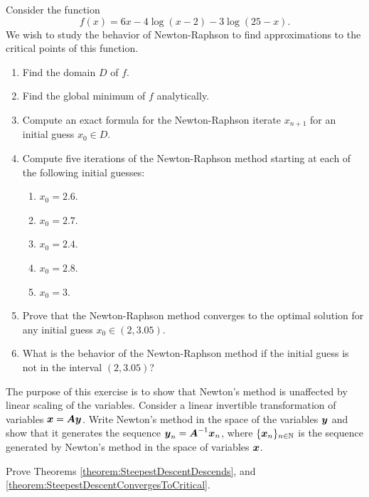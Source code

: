 \begin{problem}
Consider the function 
\begin{equation*}
f(x) = 6x -4\log(x-2) -3\log(25-x).
\end{equation*}
We wish to study the behavior of Newton-Raphson to find approximations to the critical points of this function.
\begin{enumerate}
	\item Find the domain $D$ of $f$.
	\item Find the global minimum of $f$ analytically. 
	\item Compute an exact formula for the Newton-Raphson iterate $x_{n+1}$ for an initial guess $x_0 \in D$.
	\item Compute five iterations of the Newton-Raphson method starting at each of the following initial guesses:
	\begin{enumerate}
		\item $x_0 = 2.6$.
		\item $x_0 = 2.7$.
		\item $x_0 = 2.4$.
		\item $x_0 = 2.8$.
		\item $x_0 = 3$.
	\end{enumerate}
	\item Prove that the Newton-Raphson method converges to the optimal solution for any initial guess $x_0 \in (2,3.05)$.
	\item What is the behavior of the Newton-Raphson method if the initial guess is not in the interval $(2,3.05)$?
\end{enumerate}
\end{problem}

\begin{problem}[Advanced]\cite[p.91 \#1.4.1]{bertsekas1999nonlinear}
The purpose of this exercise is to show that Newton's method is unaffected by linear scaling of the variables.  Consider a linear invertible transformation of variables $\boldsymbol{x}=\boldsymbol{A}\boldsymbol{y}$.  Write Newton's method in the space of the variables $\boldsymbol{y}$ and show that it generates the sequence $\boldsymbol{y}_n = \boldsymbol{A}^{-1}\boldsymbol{x}_n$, where $\{ \boldsymbol{x}_n \}_{n \in \mathbb{N}}$ is the sequence generated by Newton's method in the space of variables $\boldsymbol{x}$.\
\end{problem}

\begin{problem}[Advanced]
Prove Theorems \ref{theorem:SteepestDescentDescends}, and \ref{theorem:SteepestDescentConvergesToCritical}.
\end{problem}
